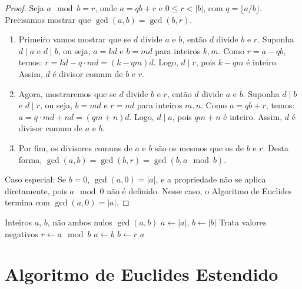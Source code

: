 \begin{proof}
Seja $a \mod b = r$, onde $a = q b + r$ e $0 \leq r < |b|$, com $q = \lfloor a / b \rfloor$. Precisamos mostrar que $\gcd(a, b) = \gcd(b, r)$.

\begin{enumerate}[noitemsep]
    \item Primeiro vamos mostrar que se $d$ divide $a$ e $b$, então $d$ divide $b$ e $r$.
          Suponha $d \mid a$ e $d \mid b$, ou seja, $a = k d$ e $b = m d$ para inteiros $k, m$.
          Como $r = a - q b$, temos: $r = k d - q \cdot m d = (k - q m) d$.
          Logo, $d \mid r$, pois $k - q m$ é inteiro.
          Assim, $d$ é divisor comum de $b$ e $r$.

    \item Agora, mostraremos que se $d$ divide $b$ e $r$, então $d$ divide $a$ e $b$.
          Suponha $d \mid b$ e $d \mid r$, ou seja, $b = m d$ e $r = n d$ para inteiros $m, n$.
          Como $a = q b + r$, temos: $a = q \cdot m d + n d = (q m + n) d$.
          Logo, $d \mid a$, pois $q m + n$ é inteiro.
          Assim, $d$ é divisor comum de $a$ e $b$.
    \item Por fim,
          os divisores comuns de $a$ e $b$ são os mesmos que os de $b$ e $r$.
          Desta forma, $\gcd(a, b) = \gcd(b, r) = \gcd(b, a \mod b)$.
\end{enumerate}

Caso especial: Se $b = 0$, $\gcd(a, 0) = |a|$, e a propriedade não se
  aplica diretamente, pois $a \mod 0$ não é definido. Nesse caso, o Algoritmo
  de Euclides termina com $\gcd(a, 0) = |a|$.
\end{proof}



\begin{algorithm}
\caption{Algoritmo de Euclides}
\begin{algorithmic}[1]
\Require Inteiros $a$, $b$, não ambos nulos
\Ensure $\gcd(a, b)$
\State $a \gets |a|$, $b \gets |b|$ \Comment Trata valores negativos
    \State $r \gets a \mod b$
    \State $a \gets b$
    \State $b \gets r$
\EndWhile
\Return $a$
\end{algorithmic}
\end{algorithm}




\section{Algoritmo de Euclides Estendido}


